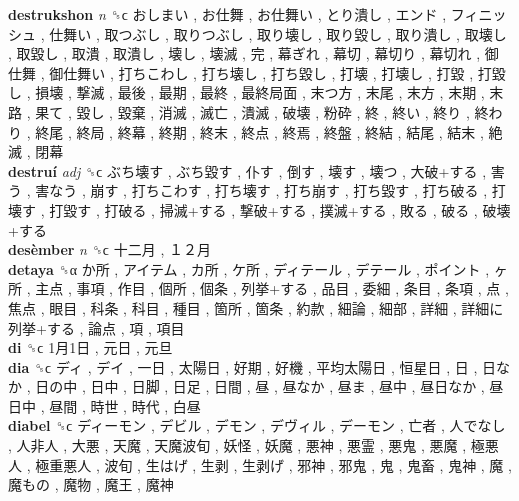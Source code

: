 \textbf{destrukshon} \emph{n}  ␝ϲ   おしまい ,  お仕舞 ,  お仕舞い ,  とり潰し ,  エンド ,  フィニッシュ ,  仕舞い ,  取つぶし ,  取りつぶし ,  取り壊し ,  取り毀し ,  取り潰し ,  取壊し ,  取毀し ,  取潰 ,  取潰し ,  壊し ,  壊滅 ,  完 ,  幕ぎれ ,  幕切 ,  幕切り ,  幕切れ ,  御仕舞 ,  御仕舞い ,  打ちこわし ,  打ち壊し ,  打ち毀し ,  打壊 ,  打壊し ,  打毀 ,  打毀し ,  損壊 ,  撃滅 ,  最後 ,  最期 ,  最終 ,  最終局面 ,  末つ方 ,  末尾 ,  末方 ,  末期 ,  末路 ,  果て ,  毀し ,  毀棄 ,  消滅 ,  滅亡 ,  潰滅 ,  破壊 ,  粉砕 ,  終 ,  終い ,  終り ,  終わり ,  終尾 ,  終局 ,  終幕 ,  終期 ,  終末 ,  終点 ,  終焉 ,  終盤 ,  終結 ,  結尾 ,  結末 ,  絶滅 ,  閉幕   \\
\textbf{destruí} \emph{adj}  ␝ϲ   ぶち壊す ,  ぶち毀す ,  仆す ,  倒す ,  壊す ,  壊つ ,  大破+する ,  害う ,  害なう ,  崩す ,  打ちこわす ,  打ち壊す ,  打ち崩す ,  打ち毀す ,  打ち破る ,  打壊す ,  打毀す ,  打破る ,  掃滅+する ,  撃破+する ,  撲滅+する ,  敗る ,  破る ,  破壊+する   \\
\textbf{desèmber} \emph{n}  ␝ϲ   十二月 ,  １２月   \\
\textbf{detaya} ␝α   か所 ,  アイテム ,  カ所 ,  ケ所 ,  ディテール ,  デテール ,  ポイント ,  ヶ所 ,  主点 ,  事項 ,  作目 ,  個所 ,  個条 ,  列挙+する ,  品目 ,  委細 ,  条目 ,  条項 ,  点 ,  焦点 ,  眼目 ,  科条 ,  科目 ,  種目 ,  箇所 ,  箇条 ,  約款 ,  細論 ,  細部 ,  詳細 ,  詳細に列挙+する ,  論点 ,  項 ,  項目   \\
\textbf{di} ␝ϲ   1月1日 ,  元日 ,  元旦   \\
\textbf{dia} ␝ϲ   ディ ,  デイ ,  一日 ,  太陽日 ,  好期 ,  好機 ,  平均太陽日 ,  恒星日 ,  日 ,  日なか ,  日の中 ,  日中 ,  日脚 ,  日足 ,  日間 ,  昼 ,  昼なか ,  昼ま ,  昼中 ,  昼日なか ,  昼日中 ,  昼間 ,  時世 ,  時代 ,  白昼   \\
\textbf{diabel} ␝ϲ   ディーモン ,  デビル ,  デモン ,  デヴィル ,  デーモン ,  亡者 ,  人でなし ,  人非人 ,  大悪 ,  天魔 ,  天魔波旬 ,  妖怪 ,  妖魔 ,  悪神 ,  悪霊 ,  悪鬼 ,  悪魔 ,  極悪人 ,  極重悪人 ,  波旬 ,  生はげ ,  生剥 ,  生剥げ ,  邪神 ,  邪鬼 ,  鬼 ,  鬼畜 ,  鬼神 ,  魔 ,  魔もの ,  魔物 ,  魔王 ,  魔神   \\
